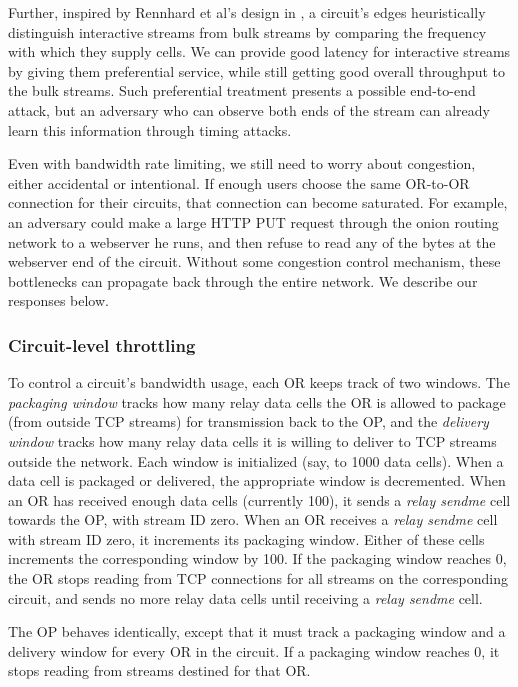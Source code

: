 \documentclass[times,10pt,twocolumn]{article}
\begin{document}
Further, inspired by Rennhard et al's design in \cite{anonnet}, a
circuit's edges heuristically distinguish interactive streams from bulk
streams by comparing the frequency with which they supply cells.  We can
provide good latency for interactive streams by giving them preferential
service, while still getting good overall throughput to the bulk
streams. Such preferential treatment presents a possible end-to-end
attack, but an adversary who can observe both
ends of the stream can already learn this information through timing
attacks.

\label{subsec:congestion}

Even with bandwidth rate limiting, we still need to worry about
congestion, either accidental or intentional. If enough users choose the
same OR-to-OR connection for their circuits, that connection can become
saturated. For example, an adversary could make a large HTTP PUT request
through the onion routing network to a webserver he runs, and then
refuse to read any of the bytes at the webserver end of the
circuit. Without some congestion control mechanism, these bottlenecks
can propagate back through the entire network.  We describe our
responses below.

\subsubsection{Circuit-level throttling}

To control a circuit's bandwidth usage, each OR keeps track of two
windows. The \emph{packaging window} tracks how many relay data cells the OR is
allowed to package (from outside TCP streams) for transmission back to the OP,
and the \emph{delivery window} tracks how many relay data cells it is willing
to deliver to TCP streams outside the network. Each window is initialized
(say, to 1000 data cells). When a data cell is packaged or delivered,
the appropriate window is decremented. When an OR has received enough
data cells (currently 100), it sends a \emph{relay sendme} cell towards the OP,
with stream ID zero. When an OR receives a \emph{relay sendme} cell with stream
ID zero, it increments its packaging window. Either of these cells
increments the corresponding window by 100. If the packaging window
reaches 0, the OR stops reading from TCP connections for all streams
on the corresponding circuit, and sends no more relay data cells until
receiving a \emph{relay sendme} cell.

The OP behaves identically, except that it must track a packaging window
and a delivery window for every OR in the circuit. If a packaging window
reaches 0, it stops reading from streams destined for that OR.
\end{document}
